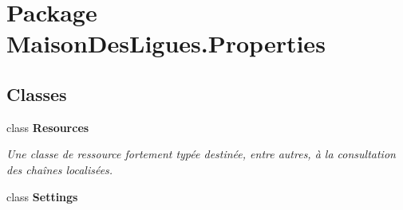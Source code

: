 \hypertarget{namespace_maison_des_ligues_1_1_properties}{\section{Package Maison\+Des\+Ligues.\+Properties}
\label{namespace_maison_des_ligues_1_1_properties}
}
\subsection*{Classes}
\begin{DoxyCompactItemize}
\item 
class {\bfseries Resources}
\begin{DoxyCompactList}\small\item\em Une classe de ressource fortement typée destinée, entre autres, à la consultation des chaînes localisées. \end{DoxyCompactList}\item 
class {\bfseries Settings}
\end{DoxyCompactItemize}
